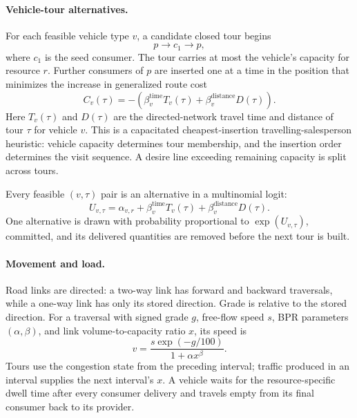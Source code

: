 \paragraph{Vehicle-tour alternatives.}
For each feasible vehicle type $v$, a candidate closed tour begins
\begin{equation}
  p \rightarrow c_1 \rightarrow p,
\end{equation}
where $c_1$ is the seed consumer. The tour carries at most the vehicle's capacity for
resource $r$. Further consumers of $p$ are inserted one at a time in the position that
minimizes the increase in generalized route cost
\begin{equation}
  C_v(\tau) =
  -\left(\beta^{\mathrm{time}}_v T_v(\tau)
  + \beta^{\mathrm{distance}}_v D(\tau)\right).
\end{equation}
Here $T_v(\tau)$ and $D(\tau)$ are the directed-network travel time and distance of tour
$\tau$ for vehicle $v$. This is a capacitated cheapest-insertion travelling-salesperson
heuristic: vehicle capacity determines tour membership, and the insertion order determines
the visit sequence. A desire line exceeding remaining capacity is split across tours.

Every feasible $(v,\tau)$ pair is an alternative in a multinomial logit:
\begin{equation}
  U_{v,\tau} =
  \alpha_{v,r}
  + \beta^{\mathrm{time}}_v T_v(\tau)
  + \beta^{\mathrm{distance}}_v D(\tau).
\end{equation}
One alternative is drawn with probability proportional to $\exp(U_{v,\tau})$, committed,
and its delivered quantities are removed before the next tour is built.

\paragraph{Movement and load.}
Road links are directed: a two-way link has forward and backward traversals, while a
one-way link has only its stored direction. Grade is relative to the stored direction.
For a traversal with signed grade $g$, free-flow speed $s$, BPR parameters
$(\alpha,\beta)$, and link volume-to-capacity ratio $x$, its speed is
\begin{equation}
  v = \frac{s\exp(-g/100)}{1+\alpha x^\beta}.
\end{equation}
Tours use the congestion state from the preceding interval; traffic produced in an
interval supplies the next interval's $x$. A vehicle waits for the resource-specific dwell
time after every consumer delivery and travels empty from its final consumer back to its
provider.

